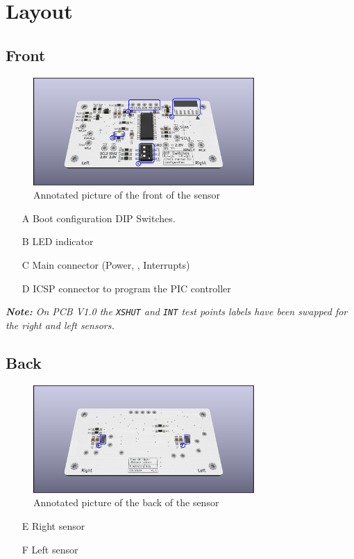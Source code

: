\section{Layout}
\subsection{Front}
\begin{figure}[h!]
 \centering
 \includegraphics[width=0.75\textwidth]{../img/V1.1/annotated-layout-front.png}
 \caption{Annotated picture of the front of the sensor}
\end{figure}
\begin{itemize}
 \item[A] Boot configuration DIP Switches.
 \item[B] LED indicator
 \item[C] Main connector (Power, \iic, Interrupts)
 \item[D] ICSP connector to program the PIC controller
\end{itemize}
\textit{\textbf{Note: }On PCB V1.0 the \texttt{XSHUT} and  \texttt{INT} test points labels have been swapped for the right and left sensors.}

\subsection{Back}
\begin{figure}[H]
 \centering
 \includegraphics[width=0.75\textwidth]{../img/V1.1/annotated-layout-back.png}
 \caption{Annotated picture of the back of the sensor}
\end{figure}
\begin{itemize}
 \item[E] Right sensor
 \item[F] Left sensor
\end{itemize}